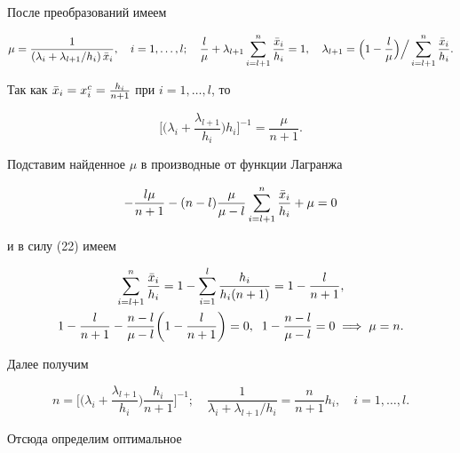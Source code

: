 После преобразований имеем


$$


\mu=\frac{1}{\left(\lambda_i+\lambda_{l+1}/h_i\right)


\Bar x_i},\quad i=1,\dotsc,l;\quad \frac{l}{\mu}+\lambda_{l+1}


\sum^n_{i=l+1}\frac{\Bar x_i}{h_i}=1,\quad


\lambda_{l+1}=\Bigl(1-\frac{l}{\mu}\Bigr)


\Bigl.\Bigr/ \sum^n_{i=l+1}\frac{\Bar x_i}{h_i}.


$$


Так как $\Bar x_i=x^c_i=\frac{h_i}{n+1}$ при $i=1,\dotsc,l$, то


$$


\biggl[\biggl(\lambda_i+\frac{\lambda_{l+1}}{h_i}\biggr)h_i


\biggr]^{-1}=\frac{\mu}{n+1}.


$$


Подставим найденное $\mu$ в производные от функции Лагранжа


$$


-\frac{l\mu}{n+1}-(n-l)\frac{\mu}{\mu-l}\sum^n_{i=l+1}


\frac{\Bar x_i}{h_i}+\mu=0


$$


и в силу (22) имеем


\begin{gather*}


\sum^n_{i=l+1}\frac{\Bar x_i}{h_i}=1-\sum^l_{i=1}


\frac{h_i}{h_i(n+1)}=1-\frac{l}{n+1},\\


1-\frac{l}{n+1}-\frac{n-l}{\mu-l}


\biggl(1-\frac{l}{n+1}\biggr)=0,\;\;


1-\frac{n-l}{\mu-l}=0\;\Longrightarrow\;\mu=n.


\end{gather*}


Далее получим


$$


n=\biggl[\biggl(\lambda_i+\frac{\lambda_{l+1}}{h_i}\biggr)


\frac{h_i}{n+1}\biggr]^{-1};\quad


\frac{1}{\lambda_i+\lambda_{l+1}/h_i}=


\frac{n}{n+1}h_i,\quad i=1,\dotsc,l.


$$


Отсюда определим оптимальное


